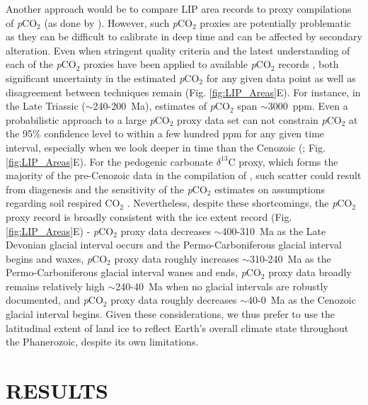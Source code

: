 \documentclass[11pt,letterpaper]{article}
\newcommand{\dC}{$\delta^{13}$C\xspace}
\begin{document}
Another approach would be to compare LIP area records to proxy compilations of \textit{p}CO$_2$ (as done by \citealt{Johansson2018a}). However, such \textit{p}CO$_2$ proxies are potentially problematic as they can be difficult to calibrate in deep time and can be affected by secondary alteration. Even when stringent quality criteria and the latest understanding of each of the \textit{p}CO$_2$ proxies have been applied to available \textit{p}CO$_2$ records \citep{Foster2017a}, both significant uncertainty in the estimated \textit{p}CO$_2$ for any given data point as well as disagreement between techniques remain (Fig. \ref{fig:LIP_Areas}E). For instance, in the Late Triassic ($\sim$240-200~Ma), estimates of \textit{p}CO$_2$ span $\sim$3000~ppm. Even a probabilistic approach to a large \textit{p}CO$_2$ proxy data set can not constrain \textit{p}CO$_2$ at the 95\% confidence level to within a few hundred ppm for any given time interval, especially when we look deeper in time than the Cenozoic (\citealp{Foster2017a}; Fig. \ref{fig:LIP_Areas}E). For the pedogenic carbonate \dC proxy, which forms the majority of the pre-Cenozoic data in the compilation of \citet{Foster2017a}, such scatter could result from diagenesis \citep{Michel2016a} and the sensitivity of the \textit{p}CO$_2$ estimates on assumptions regarding soil respired CO$_{2}$ \citep{Montanez2013a}. Nevertheless, despite these shortcomings, the \textit{p}CO$_2$ proxy record is broadly consistent with the ice extent record (Fig. \ref{fig:LIP_Areas}E) - \textit{p}CO$_2$ proxy data decreases $\sim$400-310~Ma as the Late Devonian glacial interval occurs and the Permo-Carboniferous glacial interval begins and waxes, \textit{p}CO$_2$ proxy data roughly increases $\sim$310-240~Ma as the Permo-Carboniferous glacial interval wanes and ends, \textit{p}CO$_2$ proxy data broadly remains relatively high $\sim$240-40~Ma when no glacial intervals are robustly documented, and \textit{p}CO$_2$ proxy data roughly decreases $\sim$40-0~Ma as the Cenozoic glacial interval begins. Given these considerations, we thus prefer to use the latitudinal extent of land ice to reflect Earth's overall climate state throughout the Phanerozoic, despite its own limitations.

\section*{RESULTS}
\end{document}
